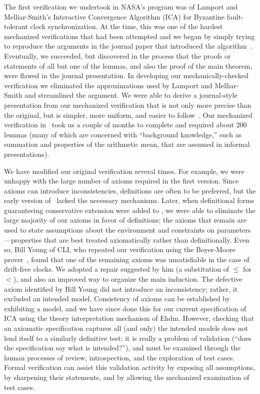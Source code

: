 The first verification we undertook in NASA's program was of Lamport
and Melliar-Smith's Interactive Convergence Algorithm (ICA) for
Byzantine fault-tolerant clock synchronization.  At the time, this
was one of the hardest mechanized verifications that had been
attempted and we began by simply trying to reproduce the arguments
in the journal paper that introduced the
algorithm~\cite{Lamport:Synchronizing}.  Eventually, we succeeded,
but discovered in the process that the proofs or statements of all
but one of the lemmas, and also the proof of the main theorem, were flawed
in the journal presentation.  In developing our mechanically-checked
verification we eliminated the approximations used by Lamport and
Melliar-Smith and streamlined the argument.  We were able to derive a
journal-style presentation from our mechanized verification that is
not only more precise than the original, but is simpler, more
uniform, and easier to
follow~\cite{Rushby89:ica,Rushby&vonHenke93}.  Our
mechanized verification in \ehdm\ took us a couple of months to
complete and required about 200 lemmas (many of which are concerned
with ``background knowledge,'' such as summation and properties of
the arithmetic mean, that are assumed in informal presentations).

We have modified our original verification several times.  For
example, we were unhappy with the large number of axioms required in
the first version.  Since axioms can introduce inconsistencies,
definitions are often to be preferred, but the early version of
\ehdm\ lacked the necessary mechanisms.  Later, when definitional
forms guaranteeing conservative extension were added to \ehdm, we
were able to eliminate the large majority of our axioms in favor of
definitions; the axioms that remain are used to state assumptions
about the environment and constraints on parameters---properties that
are best treated axiomatically rather than definitionally.  Even so,
Bill Young of CLI, who repeated our verification using the
Boyer-Moore prover~\cite{Young-ica}, found that one of the remaining
axioms was unsatisfiable in the case of drift-free clocks.  We
adopted a repair suggested by him (a substitution of $ \leq $ for $<$),
and also an improved way to organize the main induction.  The
defective axiom identified by Bill Young did not introduce an
inconsistency; rather, it excluded an intended model.  Consistency of
axioms can be established by exhibiting a model, and we have since
done this for our current specification of ICA using the theory
interpretation mechanism of {\sc Ehdm}.  However, checking that an
axiomatic specification captures all (and only) the intended models
does not lend itself to a similarly definitive test: it is really a
problem of validation (``does the specification say what is
intended?''), and must be examined through the human processes of
review, introspection, and the exploration of test cases.  Formal
verification can assist this validation activity by exposing all
assumptions, by sharpening their statements, and by allowing the
mechanized examination of test cases.

